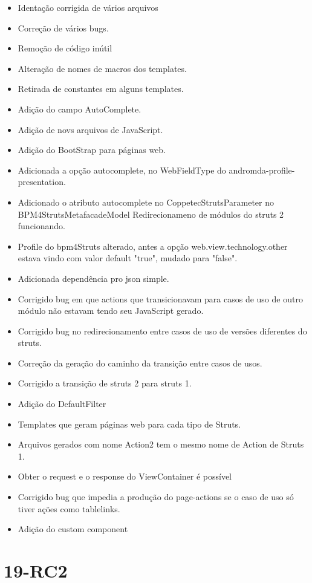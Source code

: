 \begin{itemize}
  \item Identação corrigida de vários arquivos
  \item Correção de vários bugs.
  \item Remoção de código inútil
  \item Alteração de nomes de macros dos templates.
  \item Retirada de constantes em alguns templates.
  \item Adição do campo AutoComplete.
  \item Adição de novs arquivos de JavaScript.
  \item Adição do BootStrap para páginas web.
  \item Adicionada a opção  autocomplete, no WebFieldType do
  andromda-profile-presentation.
  \item Adicionado o atributo autocomplete no CoppetecStrutsParameter no
BPM4StrutsMetafacadeModel Redirecionameno de módulos do struts 2 funcionando.
  \item Profile do bpm4Struts alterado, antes a opção web.view.technology.other
estava vindo com valor default "true", mudado para "false".
  \item Adicionada dependência pro json simple.
  \item Corrigido bug em que actions que transicionavam para casos de uso de
outro módulo não estavam tendo seu JavaScript gerado.
  \item Corrigido bug no redirecionamento entre casos de uso de versões
diferentes do struts.
  \item Correção da geração do caminho da transição entre casos de usos.
  \item Corrigido a transição de struts 2 para struts 1.
  \item Adição do DefaultFilter
  \item Templates que geram páginas web para cada tipo de Struts.
  \item Arquivos gerados com nome Action2 tem o mesmo nome de Action de Struts
1.
  \item Obter o request e o response do ViewContainer é possível
  \item Corrigido bug que impedia a produção do page-actions se o caso de uso só
tiver ações como tablelinks.
  \item Adição do custom component
\end{itemize}

\section{19-RC2}

